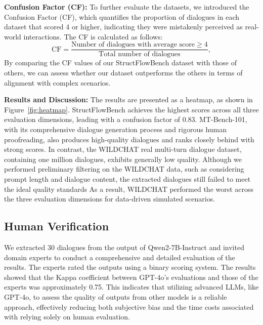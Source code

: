 \textbf{Confusion Factor (CF):}
To further evaluate the datasets, we introduced the Confusion Factor (CF), which quantifies the proportion of dialogues in each dataset that scored 4 or higher, indicating they were mistakenly perceived as real-world interactions. 
The CF is calculated as follows:
$$
\text{CF} = \frac{\text{Number of dialogues with average score} \geq 4}{\text{Total number of dialogues}},
$$
By comparing the CF values of our StructFlowBench dataset with those of others, we can assess whether our dataset outperforms the others in terms of alignment with complex scenarios.

\textbf{Results and Discussion:}
The results are presented as a heatmap, as shown in Figure~\ref{fig:heatmap}.
StructFlowBench achieves the highest scores across all three evaluation dimensions, leading with a confusion factor of 0.83. 
MT-Bench-101, with its comprehensive dialogue generation process and rigorous human proofreading, also produces high-quality dialogues and ranks closely behind with strong scores.
In contrast, the WILDCHAT real multi-turn dialogue dataset, containing one million dialogues, exhibits generally low quality. 
Although we performed preliminary filtering on the WILDCHAT data, such as considering prompt length and dialogue content, the extracted dialogues still failed to meet the ideal quality standards
As a result, WILDCHAT performed the worst across the three evaluation dimensions for data-driven simulated scenarios.

\subsection{Human Verification}

We extracted 30 dialogues from the output of Qwen2-7B-Instruct and invited domain experts to conduct a comprehensive and detailed evaluation of the results.
The experts rated the outputs using a binary scoring system. 
The results showed that the Kappa coefficient between GPT-4o's evaluations and those of the experts was approximately 0.75. 
This indicates that utilizing advanced LLMs, like GPT-4o, to assess the quality of outputs from other models is a reliable approach, effectively reducing both subjective bias and the time costs associated with relying solely on human evaluation.